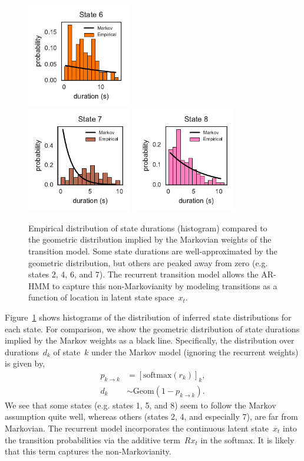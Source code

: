\documentclass{article}
\begin{document}
\begin{figure}[h]
\includegraphics[width=1.8in]{figures/arhmm/durations_5.pdf}
\\
\includegraphics[width=1.8in]{figures/arhmm/durations_6.pdf}
\includegraphics[width=1.8in]{figures/arhmm/durations_7.pdf}
\caption{Empirical distribution of state durations (histogram)
  compared to the geometric distribution implied by the Markovian
  weights of the transition model.  Some state durations are
  well-approximated by the geometric distribution, but others
  are peaked away from zero (e.g. states 2, 4, 6, and 7).  The
  recurrent transition model allows the AR-HMM to capture this
  non-Markovianity by modeling transitions as a function of location
  in latent state space~$x_t$.}
\label{fig:durations}
\end{figure}

Figure~\ref{fig:durations} shows histograms of the distribution of inferred
state distributions for each state.  For comparison, we show
the geometric distribution of state durations implied by the
Markov weights as a black line.  Specifically, the distribution
over durations~$d_k$ of state~$k$ under the Markov model (ignoring the
recurrent weights) is given by,
\begin{align*}
  p_{k \to k} &= [\mathrm{softmax}(r_{k})]_k, \\
  d_k &\sim \mathrm{Geom}(1-p_{k \to k}).
\end{align*}
We see that some states (e.g. states 1, 5, and 8) seem to follow the
Markov assumption quite well, whereas others (states 2, 4, and especially 7),
are far from Markovian.  The recurrent model incorporates the continuous
latent state~$x_t$ into the transition probabilities via the additive term~$R x_t$
in the softmax.  It is likely that this term captures the non-Markovianity.
\end{document}
